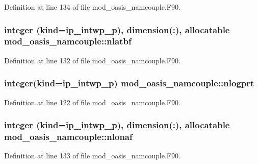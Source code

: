 Definition at line 134 of file mod\+\_\+oasis\+\_\+namcouple.\+F90.

\hypertarget{classmod__oasis__namcouple_a9b09ac96dad78313003a9436fe2f9aec}{
\subsubsection[{nlatbf}]{\setlength{\rightskip}{0pt plus 5cm}integer (kind=ip\+\_\+intwp\+\_\+p), dimension(\+:), allocatable mod\+\_\+oasis\+\_\+namcouple\+::nlatbf\hspace{0.3cm}{\ttfamily [private]}}}\label{classmod__oasis__namcouple_a9b09ac96dad78313003a9436fe2f9aec}


Definition at line 132 of file mod\+\_\+oasis\+\_\+namcouple.\+F90.

\hypertarget{classmod__oasis__namcouple_a7b8c924fdea622759b99d8f61e03ade5}{
\subsubsection[{nlogprt}]{\setlength{\rightskip}{0pt plus 5cm}integer(kind=ip\+\_\+intwp\+\_\+p) mod\+\_\+oasis\+\_\+namcouple\+::nlogprt\hspace{0.3cm}{\ttfamily [private]}}}\label{classmod__oasis__namcouple_a7b8c924fdea622759b99d8f61e03ade5}


Definition at line 122 of file mod\+\_\+oasis\+\_\+namcouple.\+F90.

\hypertarget{classmod__oasis__namcouple_ae413f2dc402b7c018e341081b8d6e208}{
\subsubsection[{nlonaf}]{\setlength{\rightskip}{0pt plus 5cm}integer (kind=ip\+\_\+intwp\+\_\+p), dimension(\+:), allocatable mod\+\_\+oasis\+\_\+namcouple\+::nlonaf\hspace{0.3cm}{\ttfamily [private]}}}\label{classmod__oasis__namcouple_ae413f2dc402b7c018e341081b8d6e208}


Definition at line 133 of file mod\+\_\+oasis\+\_\+namcouple.\+F90.

